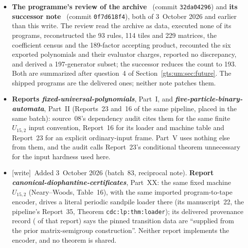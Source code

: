 \documentclass[11pt,letterpaper]{article}
\theoremstyle{definition}
\theoremstyle{remark}
\newcommand{\wtag}{\textup{[write]}}
\begin{document}
\begin{itemize}
\item \textbf{The programme's review of the archive}~\cite{repo-revmg} (commit \texttt{32da04296}) and \textbf{its successor note}~\cite{repo-ds193} (commit \texttt{0f7d618f4}), both of 3~October 2026 and earlier than this write. The review read the archive as data, executed none of its programs, reconstructed the 93 rules, 114 tiles and 229 matrices, the coefficient census and the 189-factor accepting product, recounted the six exported polynomials and their evaluator charges, reported no discrepancy, and derived a 197-generator subset; the successor reduces the count to 193. Both are summarized after question~4 of Section~\ref{gts:um:sec:future}. The shipped programs are the delivered ones; neither note patches them.
\item \textbf{Reports \emph{fixed-universal-polynomials}}, Part~I, and \textbf{\emph{five-particle-binary-automata}}, Part~II (Reports~23 and~16 of the same pipeline, placed in the same batch): source~08's dependency audit cites them for the same finite $U_{15,2}$ input convention, Report~16 for its loader and machine table and Report~23 for an explicit ordinary-input frame. Part~V uses nothing else from them, and the audit calls Report~23's conditional theorem unnecessary for the input hardness used here.
\item \wtag\ Added 3~October 2026 (batch~83, reciprocal note). \textbf{Report \emph{canonical-diophantine-certificates}}, Part~XX: the same fixed machine $U_{15,2}$ (Neary--Woods, Table~16), with the same imported program-to-tape encoder, drives a literal periodic sandpile loader there (its manuscript~22, the pipeline's Report~35, Theorem \texttt{cdc:lp:thm:loader}); its delivered provenance record ( of that report) says the pinned transition data are ``supplied from the prior matrix-semigroup construction''. Neither report implements the encoder, and no theorem is shared.
\end{itemize}
\end{document}
